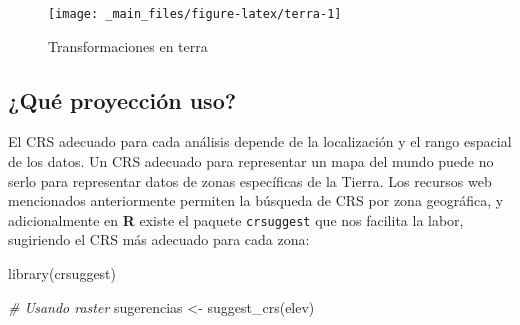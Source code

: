\documentclass[
]{report}
\newenvironment{Shaded}{\begin{snugshade}}{\end{snugshade}}
\newcommand{\CommentTok}[1]{\textcolor[rgb]{0.56,0.35,0.01}{\textit{#1}}}
\newcommand{\FunctionTok}[1]{\textcolor[rgb]{0.00,0.00,0.00}{#1}}
\newcommand{\NormalTok}[1]{#1}
\newcommand{\OtherTok}[1]{\textcolor[rgb]{0.56,0.35,0.01}{#1}}
\begin{document}
\begin{figure}

{\centering \texttt{[image: \_main\_files/figure-latex/terra-1]} 

}

\caption{Transformaciones en terra}\label{fig:terra}
\end{figure}

\hypertarget{quecrsuso}{%
\subsection{¿Qué proyección uso?}\label{quecrsuso}}

El CRS adecuado para cada análisis depende de la localización y el rango
espacial de los datos. Un CRS adecuado para representar un mapa del mundo puede
no serlo para representar datos de zonas específicas de la Tierra. Los recursos
web mencionados anteriormente permiten la búsqueda de CRS por zona geográfica, y
adicionalmente en \textbf{R} existe el paquete \texttt{crsuggest} \citep{R-crsuggest} que nos
facilita la labor, sugiriendo el CRS más adecuado para cada zona:

\begin{Shaded}
\begin{Highlighting}[]
\FunctionTok{library}\NormalTok{(crsuggest)}

\CommentTok{\# Usando raster}
\NormalTok{sugerencias }\OtherTok{\textless{}{-}} \FunctionTok{suggest\_crs}\NormalTok{(elev)}
\end{Highlighting}
\end{Shaded}
\end{document}
